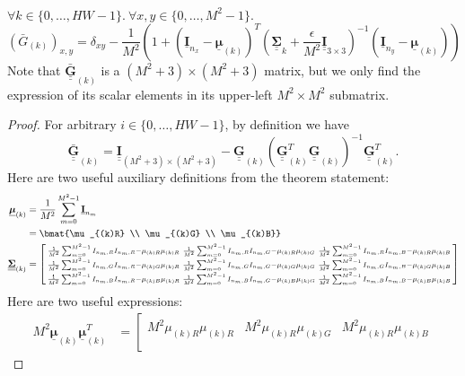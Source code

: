 \documentclass{article}
\def\vt#1{\underline{\mathbf{#1}}}
\def\vts#1{\underline{\boldsymbol{#1}}}
\def\mt#1{\underline{\underline{\mathbf{#1}}}}
\def\mts#1{\underline{\underline{\boldsymbol{#1}}}}
\begin{document}
\begin{lemma}\label{lemma4}
    $\forall k\in\{0,\dots,HW-1\}.\ \forall x,y\in\{0,\dots, M^2-1\}.$
    $$\left({\bar{G}}_{(k)}\right)_{x,y} = \delta_{xy} - \frac1{M^2}\left(1 + \left(\vt{I}_{n_x} - \vts \mu_{(k)}\right)^T \left(\mts \Sigma_k + \frac\epsilon{M^2} \mt{I}_{3\times 3}\right)^{-1} \left(\vt{I}_{n_y} - \vts \mu_{(k)}\right) \right)$$
    Note that $\mt{\bar{G}}_{(k)}$ is a $(M^2+3)\times (M^2+3)$ matrix, but we only find the expression of its scalar elements in its upper-left $M^2\times M^2$ submatrix.
    \begin{proof}
        For arbitrary $i\in\{0,\dots,HW-1\}$, by definition we have
        $$\mt{\bar{G}}_{(k)} = \mt I_{(M^2+3)\times(M^2+3)} - \mt G_{(k)}\left(\mt G_{(k)}^T \mt G_{(k)} \right)^{-1} \mt G_{(k)}^T.$$
        Here are two useful auxiliary definitions from the theorem statement:
        \begin{align*}
            \vts \mu_{(k)} &= \frac1{M^2} \sum_{m=0}^{M^2-1} \vt I_{n_m} \\
            &= \bmat{\mu_{(k)R} \\ \mu_{(k)G} \\ \mu_{(k)B}}\\
            \mts \Sigma_{(k)} &= \left[\begin{smallmatrix}
                \frac1{M^2} \sum_{m=0}^{M^2-1} I_{n_m,R}I_{n_m,R} - \mu_{(k)R}\mu_{(k)R} & \frac1{M^2} \sum_{m=0}^{M^2-1} I_{n_m,R}I_{n_m,G} - \mu_{(k)R}\mu_{(k)G} & \frac1{M^2} \sum_{m=0}^{M^2-1} I_{n_m,R}I_{n_m,B} - \mu_{(k)R}\mu_{(k)B}\\
                \frac1{M^2} \sum_{m=0}^{M^2-1} I_{n_m,G}I_{n_m,R} - \mu_{(k)G}\mu_{(k)R} & \frac1{M^2} \sum_{m=0}^{M^2-1} I_{n_m,G}I_{n_m,G} - \mu_{(k)G}\mu_{(k)G} & \frac1{M^2} \sum_{m=0}^{M^2-1} I_{n_m,G}I_{n_m,B} - \mu_{(k)G}\mu_{(k)B}\\
                \frac1{M^2} \sum_{m=0}^{M^2-1} I_{n_m,B}I_{n_m,R} - \mu_{(k)B}\mu_{(k)R} & \frac1{M^2} \sum_{m=0}^{M^2-1} I_{n_m,B}I_{n_m,G} - \mu_{(k)B}\mu_{(k)G} & \frac1{M^2} \sum_{m=0}^{M^2-1} I_{n_m,B}I_{n_m,B} - \mu_{(k)B}\mu_{(k)B}
           \end{smallmatrix}\right]
        \end{align*}
        Here are two useful expressions:
        \begin{align*}
            M^2 \vts\mu_{(k)}\vts\mu_{(k)}^T &= \left[\begin{smallmatrix}
                M^2 \mu_{(k)R}\mu_{(k)R} & M^2 \mu_{(k)R}\mu_{(k)G} & M^2 \mu_{(k)R}\mu_{(k)B} \\

\end{smallmatrix}
\end{align*}
\end{proof}
\end{lemma}
\end{document}
